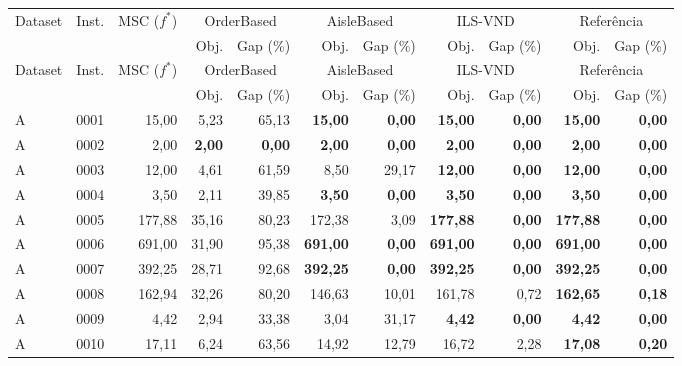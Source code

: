 \footnotesize
\begin{longtable}{llrrrrrrrrr}
\toprule
\multirow{2}{*}{Dataset} & \multirow{2}{*}{Inst.} & \multirow{2}{*}{MSC ($f^*$)} & \multicolumn{2}{c}{OrderBased} & \multicolumn{2}{c}{AisleBased} & \multicolumn{2}{c}{ILS-VND} & \multicolumn{2}{c}{Referência} \\
\cmidrule(lr){4-5} \cmidrule(lr){6-7} \cmidrule(lr){8-9} \cmidrule(lr){10-11}
 &  &  & Obj. & Gap (\%) & Obj. & Gap (\%) & Obj. & Gap (\%) & Obj. & Gap (\%) \\
\midrule
\endfirsthead
\toprule
\multirow{2}{*}{Dataset} & \multirow{2}{*}{Inst.} & \multirow{2}{*}{MSC ($f^*$)} & \multicolumn{2}{c}{OrderBased} & \multicolumn{2}{c}{AisleBased} & \multicolumn{2}{c}{ILS-VND} & \multicolumn{2}{c}{Referência} \\
\cmidrule(lr){4-5} \cmidrule(lr){6-7} \cmidrule(lr){8-9} \cmidrule(lr){10-11}
 &  &  & Obj. & Gap (\%) & Obj. & Gap (\%) & Obj. & Gap (\%) & Obj. & Gap (\%) \\
\midrule
\endhead
\bottomrule
\endfoot
A & 0001 & 15,00 & 5,23 & 65,13 & \textbf{15,00} & \textbf{0,00} & \textbf{15,00} & \textbf{0,00} & \textbf{15,00} & \textbf{0,00} \\
A & 0002 & 2,00 & \textbf{2,00} & \textbf{0,00} & \textbf{2,00} & \textbf{0,00} & \textbf{2,00} & \textbf{0,00} & \textbf{2,00} & \textbf{0,00} \\
A & 0003 & 12,00 & 4,61 & 61,59 & 8,50 & 29,17 & \textbf{12,00} & \textbf{0,00} & \textbf{12,00} & \textbf{0,00} \\
A & 0004 & 3,50 & 2,11 & 39,85 & \textbf{3,50} & \textbf{0,00} & \textbf{3,50} & \textbf{0,00} & \textbf{3,50} & \textbf{0,00} \\
A & 0005 & 177,88 & 35,16 & 80,23 & 172,38 & 3,09 & \textbf{177,88} & \textbf{0,00} & \textbf{177,88} & \textbf{0,00} \\
A & 0006 & 691,00 & 31,90 & 95,38 & \textbf{691,00} & \textbf{0,00} & \textbf{691,00} & \textbf{0,00} & \textbf{691,00} & \textbf{0,00} \\
A & 0007 & 392,25 & 28,71 & 92,68 & \textbf{392,25} & \textbf{0,00} & \textbf{392,25} & \textbf{0,00} & \textbf{392,25} & \textbf{0,00} \\
A & 0008 & 162,94 & 32,26 & 80,20 & 146,63 & 10,01 & 161,78 & 0,72 & \textbf{162,65} & \textbf{0,18} \\
A & 0009 & 4,42 & 2,94 & 33,38 & 3,04 & 31,17 & \textbf{4,42} & \textbf{0,00} & \textbf{4,42} & \textbf{0,00} \\
A & 0010 & 17,11 & 6,24 & 63,56 & 14,92 & 12,79 & 16,72 & 2,28 & \textbf{17,08} & \textbf{0,20} \\

\end{longtable}
